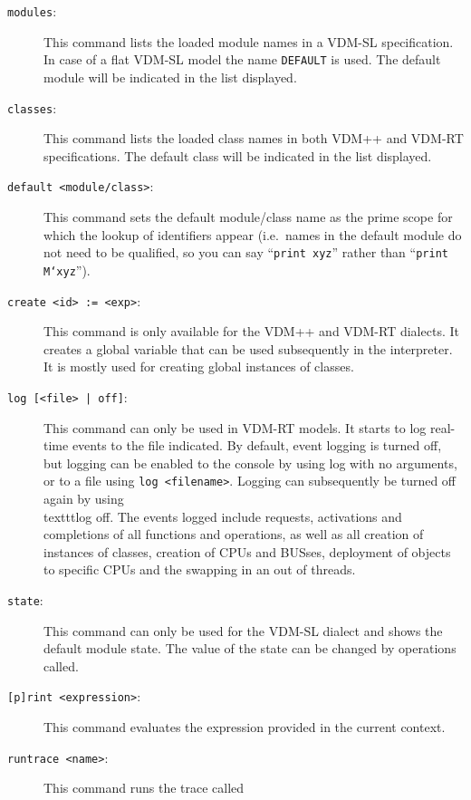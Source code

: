 \documentclass{overturerepsec}
\begin{document}
\begin{description}
\item[\texttt{modules}:] This command lists the loaded module names in
  a VDM-SL specification. In case of a flat VDM-SL model the name
  \texttt{DEFAULT} is used. The default module will be indicated in
  the list displayed.
\item[\texttt{classes}:] This command lists the loaded class names in
  both VDM++ and VDM-RT specifications. The default class will be indicated in
  the list displayed.
\item[\texttt{default <module/class>}:] This command sets the default
  module/class name as the prime scope for which the lookup of
  identifiers appear (i.e.\ names in the default module
do not need to be qualified, so you can say ``\texttt{print xyz}'' rather than
``\texttt{print M`xyz}'').
\item[\texttt{create <id> := <exp>}:] This command is only available
  for the VDM++ and VDM-RT dialects. It creates a global variable that
  can be used subsequently in the interpreter. It is mostly used for
  creating global instances of classes. 
\item[\texttt{log [<file> | off]}:] This command can only be used in
  VDM-RT models. It starts to log real-time events to the file indicated. By
  default, event logging is turned off, but logging can be enabled to
  the console by using log with no arguments, or to a file using \texttt{log
  <filename>}. Logging can subsequently be turned off again by using
  \\texttt{log off}. The events logged include requests, activations and
  completions of all functions and operations, as well as all creation
  of instances of classes, creation of CPUs and BUSses, deployment of objects
  to specific CPUs and the swapping in an out of threads.  
\item[\texttt{state}:] This command can only be used for the VDM-SL
  dialect and shows the default module state.  
  The value of the state can be changed by operations called.
\item[\texttt{[p]rint <expression>}:] This command evaluates the
  expression provided in the current
  context.     
\item[\texttt{runtrace <name>}:] This command runs the trace called

\end{description}
\end{document}

